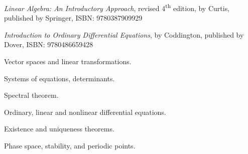 \documentclass{osucourse}
\begin{document}
\CatalogDescription
\PrerequisitesAndExclusions

\begin{Text}
\emph{Linear Algebra: An Introductory Approach}, revised 4\textsuperscript{th} edition, by Curtis, published by Springer, ISBN: 9780387909929

\emph{Introduction to Ordinary Differential Equations}, by Coddington, published by Dover, ISBN: 9780486659428
\end{Text}

\begin{TopicsList}
\item Vector spaces and linear transformations.
\item Systems of equations, determinants.
\item Spectral theorem.
\item Ordinary, linear and nonlinear differential equations.
\item Existence and uniqueness theorems.
\item Phase space, stability, and periodic points.
\end{TopicsList}
\end{document}
